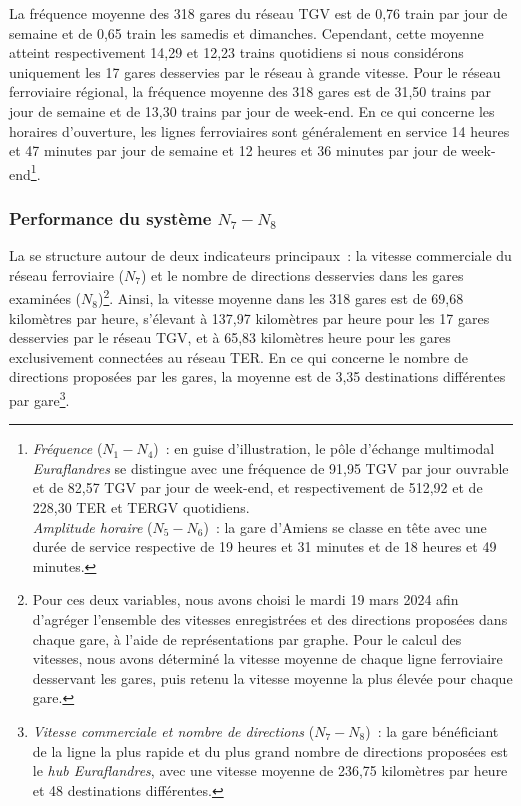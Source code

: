 \begin{refsegment}
La fréquence moyenne des 318 gares du réseau \acrshort{TGV} est de 0,76 train par jour de semaine et de 0,65 train les samedis et dimanches. Cependant, cette moyenne atteint respectivement 14,29 et 12,23 trains quotidiens si nous considérons uniquement les 17 gares desservies par le réseau à grande vitesse. Pour le réseau ferroviaire régional, la fréquence moyenne des 318 gares est de 31,50 trains par jour de semaine et de 13,30 trains par jour de week-end. En ce qui concerne les horaires d'ouverture, les lignes ferroviaires sont généralement en service 14 heures et 47 minutes par jour de semaine et 12 heures et 36 minutes par jour de week-end\footnote{
    \textsl{Fréquence} (\(N_{1} - N_{4}\))~: en guise d'illustration, le pôle d'échange multimodal \textsl{Euraflandres} se distingue avec une fréquence de 91,95 \acrshort{TGV} par jour ouvrable et de 82,57 \acrshort{TGV} par jour de week-end, et respectivement de 512,92 et de 228,30 \acrshort{TER} et \acrshort{TERGV} quotidiens.
    \\
    \textsl{Amplitude horaire} (\(N_{5} - N_{6}\))~: la gare d'Amiens se classe en tête avec une durée de service respective de 19 heures et 31 minutes et de 18 heures et 49 minutes.
}.%

\subsubsection*{Performance du système \(N_{7} - N_{8}\)
    \label{chap6:indicateurs-node-performance}
    }

La  se structure autour de deux indicateurs principaux~: la vitesse commerciale du réseau ferroviaire (\(N_{7}\)) et le nombre de directions desservies dans les gares examinées (\(N_{8}\))\footnote{
    Pour ces deux variables, nous avons choisi le mardi 19 mars 2024 afin d'agréger l'ensemble des vitesses enregistrées et des directions proposées dans chaque gare, à l'aide de représentations par graphe. Pour le calcul des vitesses, nous avons déterminé la vitesse moyenne de chaque ligne ferroviaire desservant les gares, puis retenu la vitesse moyenne la plus élevée pour chaque gare.
}. Ainsi, la vitesse moyenne dans les 318 gares est de 69,68 kilomètres par heure, s'élevant à 137,97 kilomètres par heure pour les 17 gares desservies par le réseau \acrshort{TGV}, et à 65,83 kilomètres heure pour les gares exclusivement connectées au réseau \acrshort{TER}. En ce qui concerne le nombre de directions proposées par les gares, la moyenne est de 3,35 destinations différentes par gare\footnote{
    \textsl{Vitesse commerciale et nombre de directions} (\(N_{7} - N_{8}\))~: la gare bénéficiant de la ligne la plus rapide et du plus grand nombre de directions proposées est le \textsl{hub Euraflandres}, avec une vitesse moyenne de 236,75 kilomètres par heure et 48 destinations différentes.
}.%


\end{refsegment}
